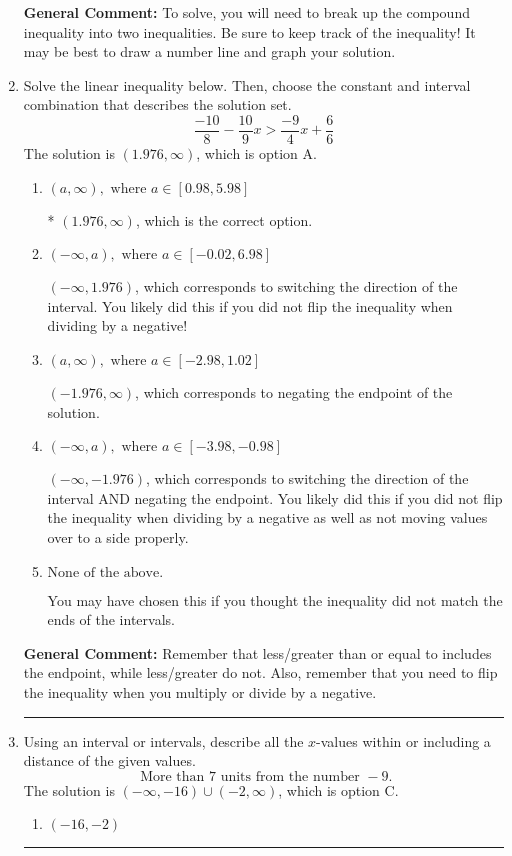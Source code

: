 \documentclass{extbook}[14pt]
\newcommand{\litem}[1]{\item #1

\rule{\textwidth}{0.4pt}}
\begin{document}
\begin{enumerate}
{\begin{enumerate}[label=\Alph*.]
\end{enumerate}

\textbf{General Comment:} To solve, you will need to break up the compound inequality into two inequalities. Be sure to keep track of the inequality! It may be best to draw a number line and graph your solution.
}
\litem{
Solve the linear inequality below. Then, choose the constant and interval combination that describes the solution set.
\[ \frac{-10}{8} - \frac{10}{9} x > \frac{-9}{4} x + \frac{6}{6} \]The solution is \( (1.976, \infty) \), which is option A.\begin{enumerate}[label=\Alph*.]
\item \( (a, \infty), \text{ where } a \in [0.98, 5.98] \)

* $(1.976, \infty)$, which is the correct option.
\item \( (-\infty, a), \text{ where } a \in [-0.02, 6.98] \)

 $(-\infty, 1.976)$, which corresponds to switching the direction of the interval. You likely did this if you did not flip the inequality when dividing by a negative!
\item \( (a, \infty), \text{ where } a \in [-2.98, 1.02] \)

 $(-1.976, \infty)$, which corresponds to negating the endpoint of the solution.
\item \( (-\infty, a), \text{ where } a \in [-3.98, -0.98] \)

 $(-\infty, -1.976)$, which corresponds to switching the direction of the interval AND negating the endpoint. You likely did this if you did not flip the inequality when dividing by a negative as well as not moving values over to a side properly.
\item \( \text{None of the above}. \)

You may have chosen this if you thought the inequality did not match the ends of the intervals.
\end{enumerate}

\textbf{General Comment:} Remember that less/greater than or equal to includes the endpoint, while less/greater do not. Also, remember that you need to flip the inequality when you multiply or divide by a negative.
}
\litem{
Using an interval or intervals, describe all the $x$-values within or including a distance of the given values.
\[ \text{ More than } 7 \text{ units from the number } -9. \]The solution is \( (-\infty, -16) \cup (-2, \infty) \), which is option C.\begin{enumerate}[label=\Alph*.]
\item \( (-16, -2) \)


\end{enumerate}}
\end{enumerate}
\end{document}
